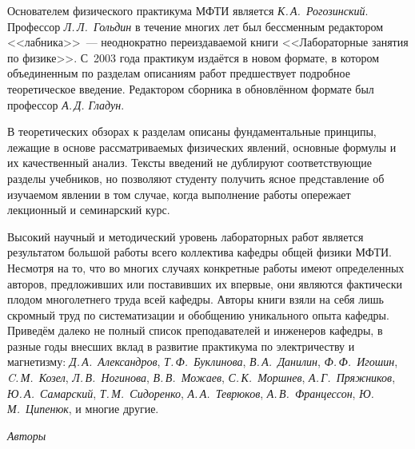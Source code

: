 Основателем физического практикума МФТИ является \textit{К.\,А.~Рогозинский}.
Профессор \textit{Л.\,Л.~Гольдин} в течение многих лет был бессменным 
редактором <<лабника>>~--- неоднократно переиздаваемой 
книги <<Лабораторные занятия по физике>>. С~2003 года
практикум издаётся в новом формате, в котором объединенным
по разделам описаниям работ предшествует подробное теоретическое введение.
Редактором сборника в обновлённом формате был профессор \textit{А.\,Д. Гладун}.

В теоретических обзорах к разделам описаны фундаментальные принципы, лежащие 
в основе рассматриваемых физических явлений, основные формулы и их 
качественный анализ. Тексты введений не дублируют соответствующие разделы учебников,
но позволяют студенту получить ясное представление об изучаемом явлении 
в том случае, когда выполнение работы опережает лекционный и семинарский курс.

Высокий научный и методический уровень лабораторных работ является результатом 
большой работы всего коллектива кафедры общей физики МФТИ. Несмотря на то, что 
во многих случаях конкретные работы имеют определенных авторов, предложивших или
поставивших их впервые, они являются фактически плодом многолетнего труда всей 
кафедры. Авторы книги взяли на себя лишь скромный труд по систематизации и 
обобщению уникального опыта кафедры.
Приведём далеко не полный список преподавателей и инженеров кафедры, 
в разные годы внесших вклад в развитие практикума по электричеству и магнетизму: 
\textit{Д.\,А.~Александров}, \textit{Т.\,Ф.~Буклинова}, \textit{В.\,А.~Данилин}, 
\textit{Ф.\,Ф.~Игошин}, \textit{C.\,М.~Козел}, \textit{Л.\,В.~Ногинова}, 
\textit{В.\,В.~Можаев}, \textit{С.\,К.~Моршнев}, \textit{А.\,Г.~Пряжников}, 
\textit{Ю.\,А.~Самарский}, \textit{Т.\,М.~Сидоренко}, \textit{А.\,А.~Теврюков}, 
\textit{А.\,В.~Францессон}, \textit{Ю.\,М.~Ципенюк}, и многие другие.

\bigskip

{\raggedleft \textit{Авторы}\par}
